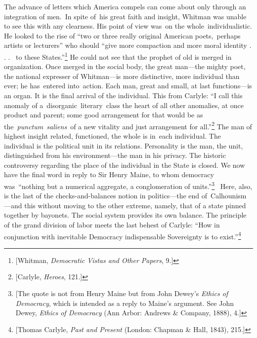 \documentclass[openany,nobib]{tufte-book}
\begin{document}
The advance of letters which America compels can come about only through
an integration of men.~In spite of~his great faith and insight, Whitman
was unable to see this with any clearness. His point of view was~on the
whole~individualistic. He looked to the rise of ``two or three really
original American poets,~perhaps artists or lecturers'' who should
``give more compaction and more moral identity . . .~ to these
States.''\footnote{{[}Whitman, \emph{Democratic Vistas and Other
  Papers}, 9.{]}} He could not see that the prophet of old is merged in
organization. Once merged in the social body, the great man---the mighty
poet, the national expresser of Whitman---is more distinctive, more
individual than ever; he has~entered into~action. Each man, great and
small, at last functions---is an organ. It is the final arrival of the
individual. This from Carlyle: ``I call this anomaly of
a~disorganic~literary~class the heart of all other anomalies, at once
product and parent; some good arrangement for that would be as
the\emph{~punctum~saliens}~of a new vitality and just arrangement for
all.''\footnote{{[}Carlyle, \emph{Heroes}, 121.{]}} The man of highest
insight related, functioned, the whole is in~each individual. The
individual is the political unit in its relations. Personality is the
man, the unit, distinguished from his environment---the man in his
privacy. The historic controversy regarding the place of the individual
in the State is closed. We now have the final word in reply to Sir Henry
Maine, to whom democracy was~``nothing but a numerical aggregate, a
conglomeration of units.''\footnote{{[}The quote is not from Henry Maine
  but from John Dewey's \emph{Ethics of Democracy}, which \emph{} is
  intended as a reply to Maine's argument. See John Dewey, \emph{Ethics
  of Democracy} (Ann Arbor: Andrews \& Company, 1888), 4.{]}}~ Here,
also, is the last of the checks-and-balances notion in politics---the
end of~Calhounism---and this without moving to the other extreme,
namely, that of a state pinned together by bayonets. The social system
provides its own balance. The principle of the grand division of labor
meets the last behest of Carlyle: ``How in conjunction with inevitable
Democracy indispensable Sovereignty is to exist.''\footnote{{[}Thomas
  Carlyle, \emph{Past and Present} (London: Chapman \& Hall, 1843),
  215.{]}}~
\end{document}
